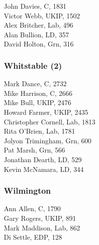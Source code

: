 \documentclass[a4paper,openany,10pt]{book}
\begin{document}


John Davies, C, 1831\\
Victor Webb, UKIP, 1502\\
Alex Britcher, Lab, 496\\
Alan Bullion, LD, 357\\
David Holton, Grn, 316\\


\subsubsection*{Whitstable (2)}



Mark Dance, C, 2732\\
Mike Harrison, C, 2666\\
Mike Bull, UKIP, 2476\\
Howard Farmer, UKIP, 2435\\
Christopher Cornell, Lab, 1813\\
Rita O'Brien, Lab, 1781\\
Jolyon Trimingham, Grn, 600\\
Pat Marsh, Grn, 566\\
Jonathan Dearth, LD, 529\\
Kevin McNamara, LD, 344\\


\subsubsection*{Wilmington}



Ann Allen, C, 1790\\
Gary Rogers, UKIP, 891\\
Mark Maddison, Lab, 862\\
Di Settle, EDP, 128\\
\end{document}
